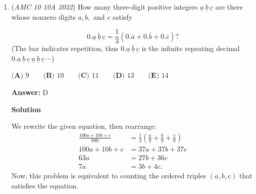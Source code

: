 \begin{enumerate}
\textbf{Solution 4}

Let $P(x) = 10x^3 - 39x^2 + 29x - 6$, and let $a, b, c$ be the roots of $P(x)$. The roots of $P(x-2)$ are then $a + 2, b + 2, c + 2,$ so the product of the roots of $P(x-2)$ is the area of the desired rectangular prism.

 $P(x-2)$ has leading coefficient $10$ and constant term $P(0-2) = P(-2) = 10(-2)^3 - 39(-2)^2 + 29(-2) - 6 = -300$. 

 Thus, by Vieta's Formulas, the product of the roots of $P(x-2)$ is $\frac{-(-300)}{10} = \boxed{\textbf{(D) } 30}$.

 -Orange\_Quail\_9

 



\textbf{Solution 5}

Let $P(x) = 10x^3 - 39x^2 + 29x - 6$. This can be factored m as $P(x) = 10(x-a)(x-b)(x-c)$, where $a$, $b$, and $c$ are the roots of $P(x)$. We want $V = (a+2)(b+2)(c+2)$.

 "Luckily" $P(-2) = 10(-2-a)(-2-b)(-2-c) = -10V$.  $P(-2) = -300$, giving $V = \boxed{\textbf{(D) } 30}$.  

 -Oxymoronic15

 (It's not just lucky. If $P(x)$ has roots $x \in \{r_i\}$, $Q(x) = P(x-2)$ has roots $y \in \{r_i+2\}$. By Vieta, the product $V$ of the roots is the negation of the constant term divided by the leading coefficient $10$ , which is $-Q(0) / 10$, which is $-P(0-2) / 10$. -oinava )

 


	\item (\textit{AMC 10 10A 2022}) How many three-digit positive integers $\underline{a} \ \underline{b} \ \underline{c}$ are there whose nonzero digits $a,b,$ and $c$ satisfy

 \[0.\overline{\underline{a}~\underline{b}~\underline{c}} = \frac{1}{3} (0.\overline{a} + 0.\overline{b} + 0.\overline{c})?\]
(The bar indicates repetition, thus $0.\overline{\underline{a}~\underline{b}~\underline{c}}$ is the infinite repeating decimal $0.\underline{a}~\underline{b}~\underline{c}~\underline{a}~\underline{b}~\underline{c}~\cdots$)


 $\textbf{(A) } 9 \qquad \textbf{(B) } 10 \qquad \textbf{(C) } 11 \qquad \textbf{(D) } 13 \qquad \textbf{(E) } 14$

 \textbf{Answer: }D



\textbf{Solution}

We rewrite the given equation, then rearrange:
 \begin{align*} \frac{100a+10b+c}{999} &= \frac13\left(\frac a9 + \frac b9 + \frac c9\right) \\ 100a+10b+c &= 37a + 37b + 37c \\ 63a &= 27b+36c \\ 7a &= 3b+4c. \end{align*}
Now, this problem is equivalent to counting the ordered triples $(a,b,c)$ that satisfies the equation.


\end{enumerate}
